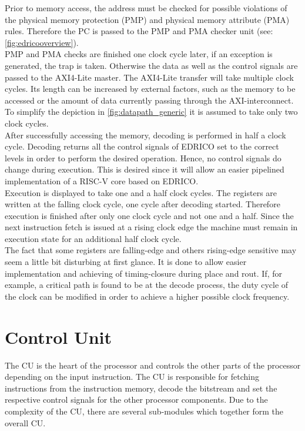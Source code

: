Prior to memory access, the address must be checked for possible violations of the physical memory protection (PMP) and physical memory attribute (PMA) rules. Therefore the PC is passed to the PMP and PMA checker unit (see: \ref{fig:edricooverview}).\\
PMP and PMA checks are finished one clock cycle later, if an exception is generated, the trap is taken. Otherwise the data as well as the control signals are passed to the AXI4-Lite master.
The AXI4-Lite transfer will take multiple clock cycles. Its length can be increased by external factors, such as the memory to be accessed or the amount of data currently passing through the AXI-interconnect. To simplify the depiction in \ref{fig:datapath_generic} it is assumed to take only two clock cycles.\\
After successfully accessing the memory, decoding is performed in half a clock cycle. Decoding returns all the control signals of EDRICO set to the correct levels in order to perform the desired operation. Hence, no control signals do change during execution. This is desired since it will allow an easier pipelined implementation of a RISC-V core based on EDRICO.\\
Execution is displayed to take one and a half clock cycles. The registers are written at the falling clock cycle, one cycle after decoding started. Therefore execution is finished after only one clock cycle and not one and a half. Since the next instruction fetch is issued at a rising clock edge the machine must remain in execution state for an additional half clock cycle. \\
The fact that some registers are falling-edge and others rising-edge sensitive may seem a little bit disturbing at first glance. It is done to allow easier implementation and achieving of timing-closure during place and rout. If, for example, a critical path is found to be at the decode process, the duty cycle of the clock can be modified in order to achieve a higher possible clock frequency.


\section{Control Unit}
The \ac{CU} is the heart of the processor and controls the other parts of the processor depending on the input instruction. The CU is responsible for fetching instructions from the instruction memory, decode the bitstream and set the respective control signals for the other processor components. Due to the complexity of the CU, there are several sub-modules which together form the overall CU.
